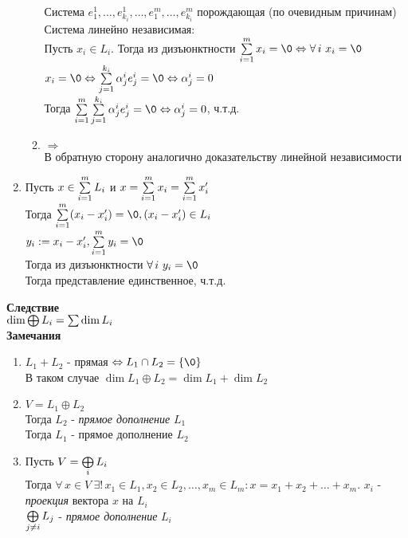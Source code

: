 \documentclass[12pt]{article}
\begin{document}
\begin{enumerate}
\begin{enumerate}
        Система $e_1^1, \ldots, e_{k_i}^1, \ldots, e_1^m, \ldots, e_{k_i}^m$ порождающая (по очевидным причинам)\\
        Система линейно независимая:\\
        Пусть $x_i \in L_i$. Тогда из дизъюнктности $\suml_{i=1}^m x_i = \0 \Leftrightarrow \forall\,i\ x_i = \0$\\
        $x_i = \0 \Leftrightarrow \suml_{j=1}^{k_i} \alpha_j^i e_j^i = \0 \Leftrightarrow \alpha_j^i = 0$\\
        Тогда $\suml_{i=1}^m \suml_{j=1}^{k_i} \alpha_j^i e_j^i = \0 \Leftrightarrow \alpha_j^i = 0$, ч.т.д.
        \item $\Rightarrow$\\
        В обратную сторону аналогично доказательству линейной независимости
    \end{enumerate}
    
    \item Пусть $x \in \sum\limits_{i=1}^m L_i$ и $x = \sum\limits_{i=1}^m x_i = \sum\limits_{i=1}^m x_i'$\\
    Тогда $\suml_{i=1}^m (x_i-x_i') = \0, (x_i-x_i') \in L_i$\\
    $y_i := x_i - x_i', \suml_{i=1}^m y_i = \0$\\
    Тогда из дизъюнктности $\forall\,i\ y_i = \0$\\
    Тогда представление единственное, ч.т.д.
\end{enumerate}
\textbf{Следствие}\\
$\dim \bigoplus\limits L_i = \sum\limits \dim L_i$\\
\textbf{Замечания}
\begin{enumerate}
    \item $L_1 + L_2$ - прямая $\Leftrightarrow L_1 \cap L_2 = \{\0\}$\\
    В таком случае $\dim L_1 \oplus L_2 = \dim L_1 + \dim L_2$
    \item $V = L_1 \oplus L_2$\\
    Тогда $L_2$ - \textit{прямое дополнение} $L_1$\\
    Тогда $L_1$ - прямое дополнение $L_2$
    \item Пусть $V = \bigoplus\limits_i L_i$\\
    Тогда $\forall\,x\in V\ \exists!\,x_1 \in L_1, x_2\in L_2, \ldots, x_m \in L_m: x = x_1 + x_2 + \ldots + x_m$. $x_i$ - \textit{проекция} вектора $x$ на $L_i$\\
    $\bigoplus\limits_{j\neq i} L_j$ - \textit{прямое дополнение} $L_i$
\end{enumerate}
\end{document}
